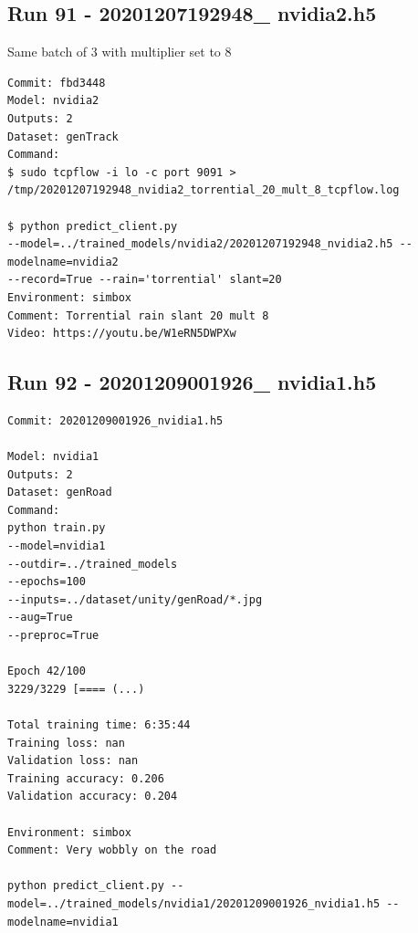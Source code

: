 \subsection{Run 91 - 20201207192948\_ nvidia2.h5 }
Same batch of 3 with multiplier set to 8
\label{app_res:91}
\begin{verbatim}
Commit: fbd3448
Model: nvidia2 
Outputs: 2
Dataset: genTrack
Command:
$ sudo tcpflow -i lo -c port 9091 > 
/tmp/20201207192948_nvidia2_torrential_20_mult_8_tcpflow.log

$ python predict_client.py
--model=../trained_models/nvidia2/20201207192948_nvidia2.h5 --modelname=nvidia2 
--record=True --rain='torrential' slant=20
Environment: simbox
Comment: Torrential rain slant 20 mult 8
Video: https://youtu.be/W1eRN5DWPXw
\end{verbatim}

\subsection{Run 92 - 20201209001926\_ nvidia1.h5 }
\begin{verbatim}
Commit: 20201209001926_nvidia1.h5

Model: nvidia1 
Outputs: 2
Dataset: genRoad
Command:
python train.py
--model=nvidia1
--outdir=../trained_models
--epochs=100
--inputs=../dataset/unity/genRoad/*.jpg
--aug=True
--preproc=True

Epoch 42/100
3229/3229 [==== (...)

Total training time: 6:35:44
Training loss: nan
Validation loss: nan
Training accuracy: 0.206
Validation accuracy: 0.204

Environment: simbox
Comment: Very wobbly on the road

python predict_client.py --model=../trained_models/nvidia1/20201209001926_nvidia1.h5 --modelname=nvidia1
\end{verbatim}


